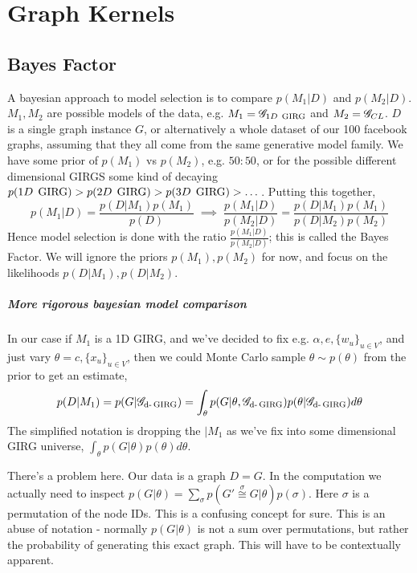 \chapter{Graph Kernels}

\section{Bayes Factor}
A bayesian approach to model selection is to compare $p(M_1 | D)$ and $p(M_2 | D)$. $M_1, M_2$ are possible models of the data, e.g. $M_1 = \mathscr{G}_{1D\; \operatorname{GIRG}}$ and $M_2 = \mathscr{G}_{CL}$. $D$ is a single graph instance $G$, or alternatively a whole dataset of our 100 facebook graphs, assuming that they all come from the same generative model family. We have some prior of $p(M_1)$ vs $p(M_2)$, e.g. $50 : 50$, or for the possible different dimensional GIRGS some kind of decaying $p(1D\; \operatorname{GIRG}) > p(2D\; \operatorname{GIRG}) > p(3D\; \operatorname{GIRG}) > \dots$.
Putting this together,
\begin{equation}
  p(M_1 | D) = \frac{p(D | M_1) p(M_1)}{p(D)} 
  \;
  \implies
  \;
  \frac{p(M_1 | D)}{p(M_2 | D)} = \frac{p(D | M_1) p(M_1)}{p(D | M_2) p(M_2)}
\end{equation}
Hence model selection is done with the ratio $\frac{p(M_1 | D)}{p(M_2 | D)}$; this is called the Bayes Factor.
We will ignore the priors $p(M_1), p(M_2)$ for now, and focus on the likelihoods $p(D | M_1), p(D | M_2)$.



\paragraph{More rigorous bayesian model comparison}
In our case if $M_1$ is a 1D GIRG, and we've decided to fix e.g. $\alpha, e, \{w_u\}_{u \in V}$, and just vary $\theta = c, \{x_u\}_{u \in V}$, then we could Monte Carlo sample $\theta \sim p(\theta)$ from the prior to get an estimate, 
\begin{equation} \label{eq:incorrect_girg_model_likelihood}
  p(D| M_1) = p(G | \mathscr{G}_{\text{d-}\operatorname{GIRG}}) = \int_\theta p(G | \theta, \mathscr{G}_{\text{d-}\operatorname{GIRG}}) p(\theta | \mathscr{G}_{\text{d-}\operatorname{GIRG}}) d\theta
\end{equation}
The simplified notation is dropping the $| M_1$ as we've fix into some dimensional GIRG universe, $\int_\theta p(G | \theta) p(\theta) d\theta$.

There's a problem here. Our data is a graph $D=G$. In the computation we actually need to inspect $p(G | \theta) = \sum_{\sigma} p(G' \stackrel{\sigma}{\cong} G | \theta) p(\sigma)$. Here $\sigma$ is a permutation of the node IDs. This is a confusing concept for sure. This is an abuse of notation - normally $p(G | \theta)$ is not a sum over permutations, but rather the probability of generating this exact graph. This will have to be contextually apparent.

